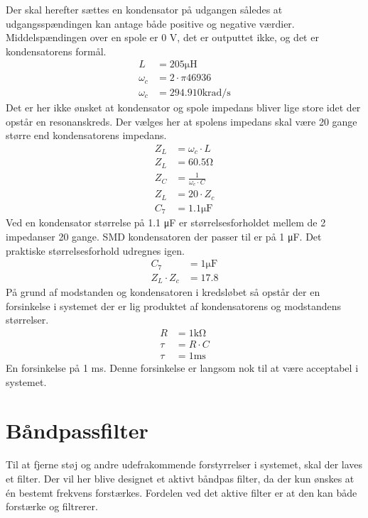 Der skal herefter sættes en kondensator på udgangen således at udgangsspændingen kan antage både positive og negative værdier. 
Middelspændingen over en spole er 0 \si{\volt}, det er outputtet ikke, og det er kondensatorens formål. 
\begin{align}
	L & = 205 \si{\micro \henry} \nonumber  \\
	\omega_c & = 2 \cdot \pi 46936 \\
	\omega_c & = 294.910 \si{\kilo\radian\per\second} \nonumber 
	\end{align}
Det er her ikke ønsket at kondensator og spole impedans bliver lige store idet der opstår en resonanskreds. 
Der vælges her at spolens impedans skal være 20 gange større end kondensatorens impedans.
\begin{align}
	Z_L & = \omega_c \cdot L \\
	Z_L & = 60.5 \si{\ohm} \nonumber \\
	Z_C & = \frac{1}{\omega_c \cdot C} \\
	Z_L & = 20 \cdot Z_c \\
	C_7 & = 1.1 \si{\micro\farad} \nonumber
	\end{align}
Ved en kondensator størrelse på 1.1 \si{\micro\farad} er størrelsesforholdet mellem de 2 impedanser 20 gange. 
SMD kondensatoren der passer til er på 1 \si{\micro\farad}. Det praktiske størrelsesforhold udregnes igen.
\begin{align}
	C_7 & = 1 \si{\micro\farad} \nonumber \\
	Z_L \cdot Z_c & = 17.8 \nonumber
	\end{align}
På grund af modstanden og kondensatoren i kredsløbet så opstår der en forsinkelse i systemet der er lig produktet af kondensatorens og modstandens størrelser. 
\begin{align}
	R & = 1 \si{\kilo\ohm} \nonumber \\
	\tau & = R \cdot C \\
	\tau & = 1 \si{\milli\second} \nonumber
\end{align}
En forsinkelse på 1 \si{\milli\second}. 
Denne forsinkelse er langsom nok til at være acceptabel i systemet. 
\section{Båndpassfilter}
Til at fjerne støj og andre udefrakommende forstyrrelser i systemet, skal der laves et filter.
Der vil her blive designet et aktivt båndpas filter, da der kun ønskes at én bestemt frekvens forstærkes.
Fordelen ved det aktive filter er at den kan både forstærke og filtrerer.

